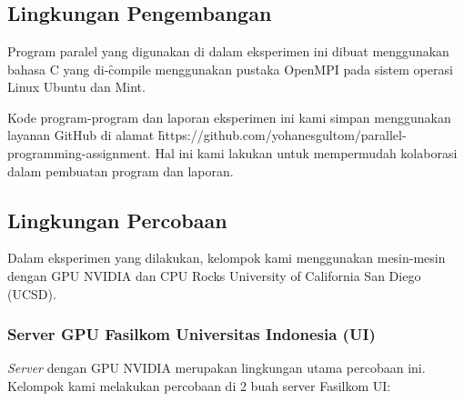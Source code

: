\chapter{\lingkungan}

\section{Lingkungan Pengembangan}

Program paralel yang digunakan di dalam eksperimen ini dibuat menggunakan bahasa C yang di-\f{compile} menggunakan pustaka OpenMPI pada sistem operasi Linux Ubuntu dan Mint.

Kode program-program dan laporan eksperimen ini kami simpan menggunakan layanan GitHub di alamat \f{https://github.com/yohanesgultom/parallel-programming-assignment}. Hal ini kami lakukan untuk mempermudah kolaborasi dalam pembuatan program dan laporan.

\section{Lingkungan Percobaan}

Dalam eksperimen yang dilakukan, kelompok kami menggunakan mesin-mesin dengan GPU NVIDIA dan \cluster CPU Rocks University of California San Diego (UCSD).

\subsection{Server GPU Fasilkom Universitas Indonesia (UI)}
\textit{Server} dengan GPU NVIDIA merupakan lingkungan utama percobaan ini. Kelompok kami melakukan percobaan di 2 buah server Fasilkom UI:

